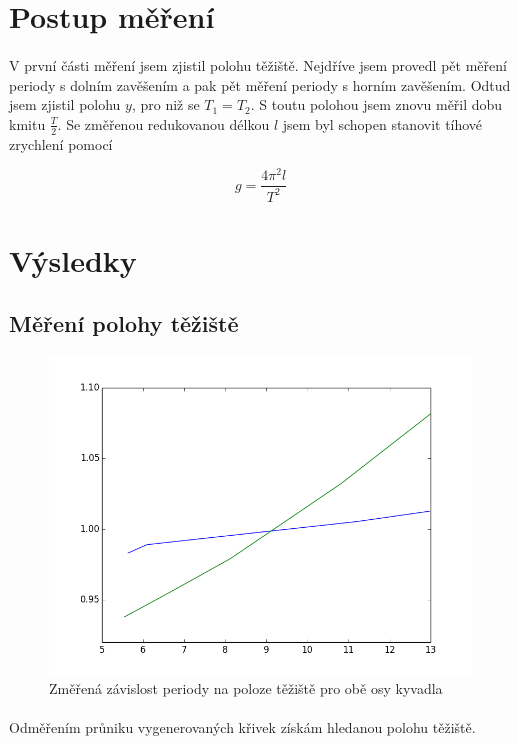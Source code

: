 \documentclass[a4paper,11pt]{article}
\begin{document}
\section{Postup měření}

    \paragraph{} V první části měření jsem zjistil polohu těžiště. Nejdříve
    jsem provedl pět měření periody s dolním zavěšením a pak pět měření periody
    s horním zavěšením. Odtud jsem zjistil polohu $y$, pro niž se $T_{1} = T_{2}$.
    S toutu polohou jsem znovu měřil dobu kmitu $\frac{T}{2}$. Se změřenou
    redukovanou délkou $l$ jsem byl schopen stanovit tíhové zrychlení pomocí

    \begin{equation}
        g = \frac{4 \pi^{2} l}{T^{2}}
    \end{equation}

\section{Výsledky}

    \subsection{Měření polohy těžiště}

        \begin{figure}[H]
            \centering
            \includegraphics[width=0.6\linewidth]{delka_perioda.png}
            \caption{Změřená závislost periody na poloze těžiště pro obě osy kyvadla}
        \end{figure}

        \paragraph{} Odměřením průniku vygenerovaných křivek získám hledanou polohu těžiště.
\end{document}
